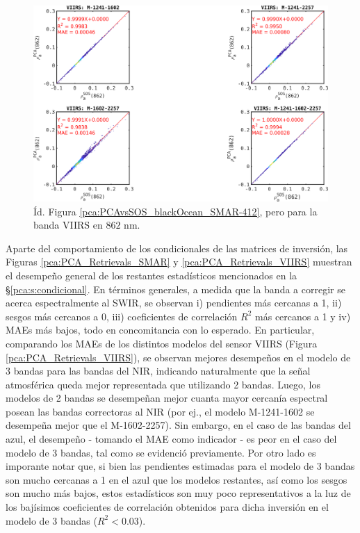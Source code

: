         \begin{figure}
        \centering
        \includegraphics[width=\textwidth]{pca/figures/PCAvsSOS_blackOcean_VIIRS-862.png}
        \caption[Reflectancia de aerosoles estimada por PCA vs. simulada para la banda de VIIRS en $862$ nm.]{Íd. Figura \ref{pca:PCAvsSOS_blackOcean_SMAR-412}, pero para la banda VIIRS en $862$ nm.}
        \label{pca:PCAvsSOS_blackOcean_VIIRS-862}
        \end{figure}

        Aparte del comportamiento de los condicionales de las matrices de inversión, las Figuras \ref{pca:PCA_Retrievals_SMAR} y \ref{pca:PCA_Retrievals_VIIRS} muestran el desempeño general de los restantes estadísticos mencionados en la \S \ref{pca:s:condicional}. En términos generales, a medida que la banda a corregir se acerca espectralmente al SWIR, se observan i) pendientes más cercanas a 1, ii) sesgos más cercanos a 0, iii) coeficientes de correlación $R^{2}$ más cercanos a 1 y iv) MAEs más bajos, todo en concomitancia con lo esperado. En particular, comparando los MAEs de los distintos modelos del sensor VIIRS (Figura \ref{pca:PCA_Retrievals_VIIRS}), se observan mejores desempeños en el modelo de 3 bandas para las bandas del NIR, indicando naturalmente que la señal atmosférica queda mejor representada que utilizando 2 bandas. Luego, los modelos de 2 bandas se desempeñan mejor cuanta mayor cercanía espectral posean las bandas correctoras al NIR (por ej., el modelo M-1241-1602 se desempeña mejor que el M-1602-2257). Sin embargo, en el caso de las bandas del azul, el desempeño - tomando el MAE como indicador - es peor en el caso del modelo de 3 bandas, tal como se evidenció previamente.
        Por otro lado es imporante notar que, si bien las pendientes estimadas para el modelo de 3 bandas son mucho cercanas a 1 en el azul que los modelos restantes, así como los sesgos son mucho más bajos, estos estadísticos son muy poco representativos a la luz de los bajísimos coeficientes de correlación obtenidos para dicha inversión en el modelo de 3 bandas ($R^{2}<0.03$).

